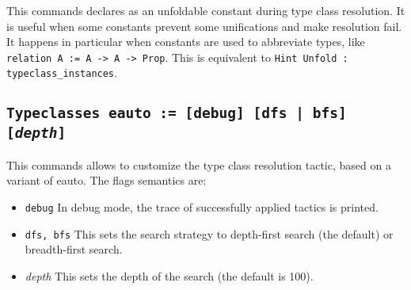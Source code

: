 This commands declares {\ident} as an unfoldable constant during type
class resolution. It is useful when some constants prevent some
unifications and make resolution fail. It happens in particular when constants are
used to abbreviate types, like {\tt relation A := A -> A -> Prop}.
This is equivalent to {\tt Hint Unfold {\ident} : typeclass\_instances}.

\subsection{\tt Typeclasses eauto := [debug] [dfs | bfs] [\emph{depth}]}
\label{TypeclassesEauto}

This commands allows to customize the type class resolution tactic,
based on a variant of eauto. The flags semantics are:
\begin{itemize}
\item {\tt debug} In debug mode, the trace of successfully applied
  tactics is printed.
\item {\tt dfs, bfs} This sets the search strategy to depth-first search
  (the default) or breadth-first search.
\item {\emph{depth}} This sets the depth of the search (the default is 100).
\end{itemize}

